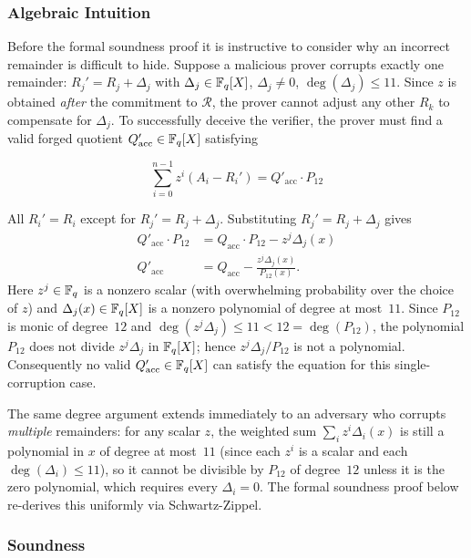 \subsubsection{Algebraic Intuition}\label{sec:iop:alg-intuition}

Before the formal soundness proof it is instructive to consider why an incorrect
remainder is difficult to hide.  Suppose a malicious prover corrupts exactly one remainder:
$R_j' = R_j + \Delta_j$ with $\Delta_j \in \mathbb{F}_q[X]$, $\Delta_j \neq 0$,
$\deg(\Delta_j) \leq 11$.  Since $z$ is obtained \emph{after} the commitment to
$\mathcal{R}$, the prover cannot adjust any other $R_k$ to compensate for $\Delta_j$.
To successfully deceive the verifier, the prover must find a valid forged quotient
$Q'_\text{acc} \in \mathbb{F}_q[X]$ satisfying

$$\sum_{i=0}^{n-1} z^i(A_i - R_i') = Q'_\text{acc} \cdot P_{12}$$

All $R_i' = R_i$ except for $R_j' = R_j + \Delta_j$. Substituting $R_j' = R_j + \Delta_j$ gives
\begin{align*}
Q'_\text{acc} \cdot P_{12} &= Q_\text{acc} \cdot P_{12} - z^j\Delta_j(x) \\
Q'_\text{acc} &= Q_\text{acc} - \frac{z^j\Delta_j(x)}{P_{12}(x)}.
\end{align*}
Here $z^j \in \mathbb{F}_q$ is a nonzero scalar (with overwhelming probability over the
choice of $z$) and $\Delta_j(x) \in \mathbb{F}_q[X]$ is a nonzero polynomial of degree
at most~$11$.  Since $P_{12}$ is monic of degree~$12$ and
$\deg(z^j\Delta_j) \leq 11 < 12 = \deg(P_{12})$, the polynomial $P_{12}$ does not
divide $z^j\Delta_j$ in $\mathbb{F}_q[X]$; hence $z^j\Delta_j/P_{12}$ is not a
polynomial. Consequently no valid $Q'_\text{acc} \in \mathbb{F}_q[X]$ can satisfy the
equation for this single-corruption case.


The same degree argument extends immediately to an adversary who corrupts
\emph{multiple} remainders: for any scalar $z$, the weighted sum
$\sum_i z^i \Delta_i(x)$ is still a polynomial in $x$ of degree at most~$11$
(since each $z^i$ is a scalar and each $\deg(\Delta_i) \leq 11$), so it cannot
be divisible by $P_{12}$ of degree~$12$ unless it is the zero polynomial, which
requires every $\Delta_i = 0$.  The formal soundness proof below re-derives this
uniformly via Schwartz-Zippel.


\subsubsection{Soundness}\label{sec:iop:soundness}

